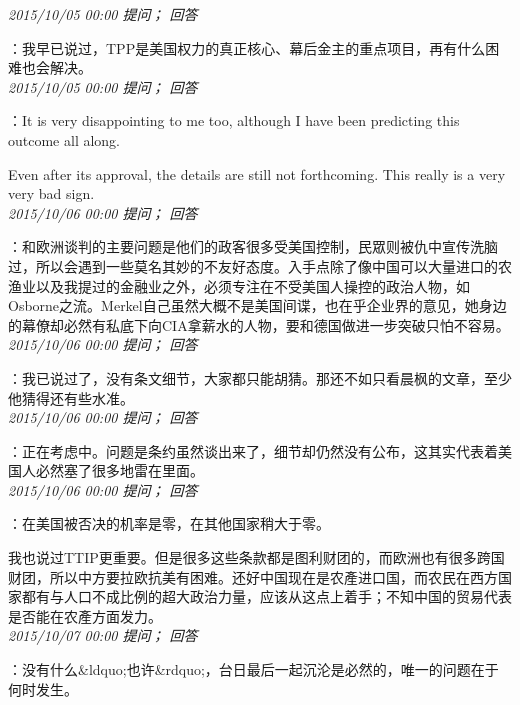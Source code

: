 \documentclass[twocolumn]{ctexart}
\begin{document}
\textit{\hfill\noindent\small 2015/10/05 00:00 提问； 回答}

：我早已说过，TPP是美国权力的真正核心、幕后金主的重点项目，再有什么困难也会解决。\\

\textit{\hfill\noindent\small 2015/10/05 00:00 提问； 回答}

：It is very disappointing to me too, although I have been predicting this outcome all along.

Even after its approval, the details are still not forthcoming. This really is a very very bad sign.\\

\textit{\hfill\noindent\small 2015/10/06 00:00 提问； 回答}

：和欧洲谈判的主要问题是他们的政客很多受美国控制，民眾则被仇中宣传洗脑过，所以会遇到一些莫名其妙的不友好态度。入手点除了像中国可以大量进口的农渔业以及我提过的金融业之外，必须专注在不受美国人操控的政治人物，如Osborne之流。Merkel自己虽然大概不是美国间谍，也在乎企业界的意见，她身边的幕僚却必然有私底下向CIA拿薪水的人物，要和德国做进一步突破只怕不容易。\\

\textit{\hfill\noindent\small 2015/10/06 00:00 提问； 回答}

：我已说过了，没有条文细节，大家都只能胡猜。那还不如只看晨枫的文章，至少他猜得还有些水准。\\

\textit{\hfill\noindent\small 2015/10/06 00:00 提问； 回答}

：正在考虑中。问题是条约虽然谈出来了，细节却仍然没有公布，这其实代表着美国人必然塞了很多地雷在里面。\\

\textit{\hfill\noindent\small 2015/10/06 00:00 提问； 回答}

：在美国被否决的机率是零，在其他国家稍大于零。

我也说过TTIP更重要。但是很多这些条款都是图利财团的，而欧洲也有很多跨国财团，所以中方要拉欧抗美有困难。还好中国现在是农產进口国，而农民在西方国家都有与人口不成比例的超大政治力量，应该从这点上着手；不知中国的贸易代表是否能在农產方面发力。\\

\textit{\hfill\noindent\small 2015/10/07 00:00 提问； 回答}

：没有什么\&ldquo;也许\&rdquo;，台日最后一起沉沦是必然的，唯一的问题在于何时发生。\\
\end{document}
